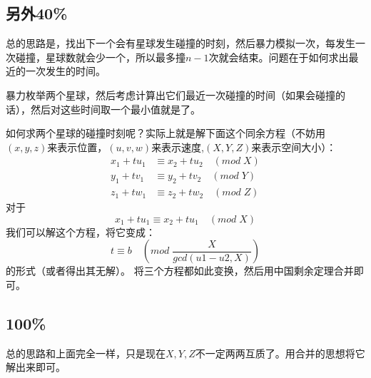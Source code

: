 \documentclass[10pt,a4paper,twoside]{article}
\begin{document}
		\subsection{另外40\%}
			总的思路是，找出下一个会有星球发生碰撞的时刻，然后暴力模拟一次，每发生一次碰撞，星球数就会少一个，所以最多撞$n-1$次就会结束。问题在于如何求出最近的一次发生的时间。
			
			暴力枚举两个星球，然后考虑计算出它们最近一次碰撞的时间（如果会碰撞的话），然后对这些时间取一个最小值就是了。
			
			如何求两个星球的碰撞时刻呢？实际上就是解下面这个同余方程（不妨用$(x,y,z)$来表示位置，$(u,v,w)$来表示速度,$(X,Y,Z)$来表示空间大小）：
			\[
				\begin{split}
					x_1 + tu_1 & \equiv x_2 + tu_2 \quad (mod \; X) \\
					y_1 + tv_1 & \equiv y_2 + tv_2 \quad (mod \; Y) \\
					z_1 + tw_1 & \equiv z_2 + tw_2 \quad (mod \; Z)
				\end{split}
			\]
			对于
			$$
				x_1 + tu_1 \equiv x_2 + tu_1 \quad (mod \; X) 
			$$
			我们可以解这个方程，将它变成：
			$$
				t \equiv b \quad (mod \; \frac{X}{gcd(u1-u2,X)})
			$$
			的形式（或者得出其无解）。
			将三个方程都如此变换，然后用中国剩余定理合并即可。
		
		\subsection{100\%}
			总的思路和上面完全一样，只是现在$X,Y,Z$不一定两两互质了。用合并的思想将它解出来即可。
		
\end{document}
